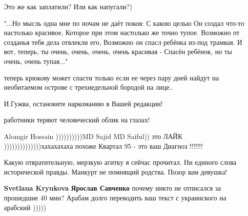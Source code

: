 \begin{itemize}
Это же как заплатили? Или как напугали?)

 

\obeycr
"...Но мысль одна мне по ночам не даёт покоя:
С какою целью Он создал что-то настолько красивое,
Которое при этом настолько же точно тупое.
Возможно от созданья тебя дела отвлекли его,
Возможно он спасл ребёнка из-под трамвая.
И вот, теперь, ты очень, очень, очень, очень красивая -
Спасён ребёнок, но ты очень, очень тупая..."
\restorecr


 

теперь крюкову может спасти только если ее через пару дней найдут на
необитаемом острове с трехнедельной бородой на лице..

И.Гужва, остановите наркоманию в Вашей редакции!

работники теряют человеческий облик на глазах!

 
Alomgir Hossain ))))))))))MD Sajid MD Saiful)) это ЛАЙК ))))))))))))))хахахахаха похоже Квартал 95 - это ваш Диагноз !!!!!!!

 
Какую отвратительную, мерзкую агитку я сейчас прочитал. Ни единого слова исторической правды. Манкурт не помнящий родства. Позор вам девушка!

 
\textbf{Svetlana Kryukova}
\textbf{Ярослав Савченко} почему никто не отписался за прошедшие 40 мин?
Арабам долго переводить ваш текст с украинского на арабский )))))


\end{itemize}
